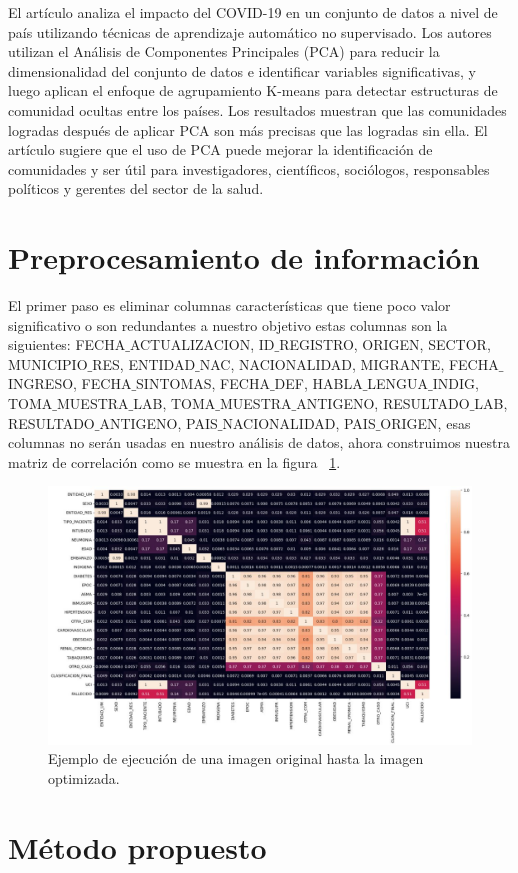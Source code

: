 \documentclass[a4paper,
               ]{jacow}
\begin{document}
El artículo \cite{Chaudhary2021} analiza el impacto del COVID-19 en un conjunto de datos a nivel de país utilizando técnicas de aprendizaje automático no supervisado. Los autores utilizan el Análisis de Componentes Principales (PCA) para reducir la dimensionalidad del conjunto de datos e identificar variables significativas, y luego aplican el enfoque de agrupamiento K-means para detectar estructuras de comunidad ocultas entre los países. Los resultados muestran que las comunidades logradas después de aplicar PCA son más precisas que las logradas sin ella. El artículo sugiere que el uso de PCA puede mejorar la identificación de comunidades y ser útil para investigadores, científicos, sociólogos, responsables políticos y gerentes del sector de la salud.


\section{Preprocesamiento de información}

El primer paso es eliminar columnas características que tiene poco valor significativo o son redundantes a nuestro objetivo estas columnas son la siguientes:   FECHA$\_$ACTUALIZACION, ID$\_$REGISTRO, ORIGEN, SECTOR, MUNICIPIO$\_$RES, ENTIDAD$\_$NAC,    NACIONALIDAD, MIGRANTE, FECHA$\_$INGRESO, FECHA$\_$SINTOMAS, FECHA$\_$DEF, HABLA$\_$LENGUA$\_$INDIG, TOMA$\_$MUESTRA$\_$LAB, TOMA$\_$MUESTRA$\_$ANTIGENO, RESULTADO$\_$LAB, RESULTADO$\_$ANTIGENO, PAIS$\_$NACIONALIDAD, PAIS$\_$ORIGEN, esas columnas no serán usadas en nuestro análisis de datos, ahora construimos nuestra matriz de correlación como se muestra en la figura  ~\ref{fig:matrix_correlacion}.

\begin{figure}[!h]
    \centering
    \includegraphics*[width=.5\textwidth]{matrizdeCorrelacion}
    \caption{Ejemplo de ejecución de una imagen original hasta la imagen optimizada.}
    \label{fig:matrix_correlacion}
\end{figure}

\section{Método propuesto}
\end{document}

